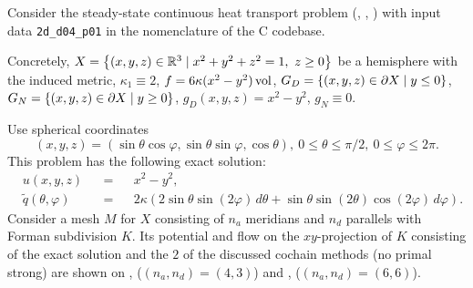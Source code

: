 \begin{example}
  \label{idec/diffusion/continuous/steady_state/examples/2d_d04_p01-example}
  Consider the steady-state continuous heat transport problem
  (,
   ,
   )
  with input data \verb|2d_d04_p01| in the nomenclature of the C codebase.

  Concretely,
    $X = \left\{ (x, y, z) \in \mathbb{R}^3 \mid x^2 + y^2 + z^2 = 1,\ z \geq 0 \right\}$ be a
      hemisphere with the induced metric,
    $\kappa_1 \equiv 2$,
    $f = 6 \kappa (x^2 - y^2) \mathop{\rm vol}\nolimits$,
    $G_D = \left\{ (x, y, z) \in \partial X \mid y \leq 0 \right\}$,
    $G_N = \left\{ (x, y, z) \in \partial X \mid y \geq 0 \right\}$,
    $g_D(x, y, z) = x^2 - y^2$,
    $g_N \equiv 0$.

  Use spherical coordinates
  \begin{equation}
    (x, y, z)
    = (\sin \theta \cos \varphi, \sin \theta \sin \varphi, \cos \theta),\
    0 \leq \theta \leq \pi / 2,\
    0 \leq \varphi \leq 2 \pi.
  \end{equation}
  This problem has the following exact solution:
  \begin{subequations}
    \begin{alignat}{3}
      & u(x, y, z) && = && x^2 - y^2, \\
      & \tilde{q}(\theta, \varphi) &&
      = && 2 \kappa (2 \sin \theta \sin(2 \varphi)\, d \theta
                     + \sin \theta \sin(2 \theta) \cos (2 \varphi)\, d \varphi).
    \end{alignat}
  \end{subequations}
  Consider a mesh $M$ for $X$ consisting of $n_a$ meridians and $n_d$ parallels
  with Forman subdivision $K$.
  Its potential and flow on the $xy$-projection of $K$ consisting of the exact
  solution and the $2$ of the discussed cochain methods (no primal strong) are
  shown on
  ,
  ($(n_a, n_d) = (4, 3)$)
  and
  ,
  ($(n_a, n_d) = (6, 6)$).
\end{example}
